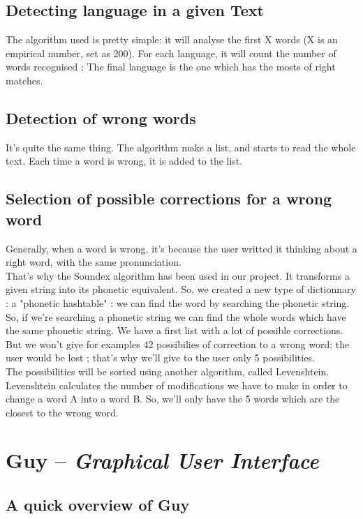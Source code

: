 \documentclass[12pt]{report}
\begin{document}
\section{Detecting language in a given Text}
The algorithm used is pretty simple: it will analyse the first X words (X is an empirical number, set
as 200). 
For each language, it will count the number of words recognised ; The final language is the one which has the mosts of right matches.
\section{Detection of wrong words}
It's quite the same thing. The algorithm make a list, and starts to read the whole text. Each time a word is wrong, it is added to the list.
\section{Selection of possible corrections for a wrong word}
Generally, when a word is wrong, it's because the user writted it thinking about a right word, with the same pronunciation.\\
That's why the Soundex algorithm has been used in our project. It transforms a given string into its phonetic equivalent.
So, we created a new type of dictionnary : a "phonetic hashtable" : we can find the word by searching the phonetic string.
So, if we're searching a phonetic string we can find the whole words which have the same phonetic string.
We have a first list with a lot of possible corrections.\\
But we won't give for examples 42 possibilies of correction to a wrong word: the user would be lost ; that's why we'll give
to the user only 5 possibilities.\\
The possibilities will be sorted using another algorithm, called Levenshtein.
Levenshtein calculates the number of modifications we have to make in order to change a word A into a word B.
So, we'll only have the 5 words which are the closest to the wrong word. 
 
\chapter{Guy -- \emph{Graphical User Interface}}

\section{A quick overview of Guy}
\end{document}
